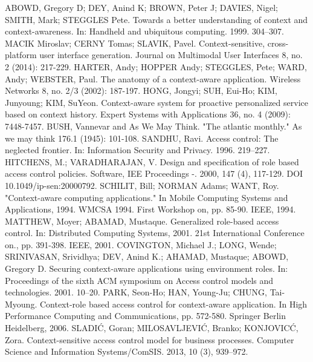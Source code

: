 \documentclass{poster15}
\begin{document}
\begin{thebibliography}{9}
ABOWD, Gregory D; DEY, Anind K; BROWN, Peter J; DAVIES, Nigel; SMITH, Mark; STEGGLES Pete. Towards a better understanding of context and context-awareness. In: Handheld and ubiquitous computing. 1999. 304–307.
MACIK Miroslav; CERNY Tomas; SLAVIK, Pavel. Context-sensitive, cross-platform user interface generation. Journal on Multimodal User Interfaces 8, no. 2 (2014): 217-229.
HARTER, Andy; HOPPER Andy; STEGGLES, Pete; WARD, Andy; WEBSTER, Paul. The anatomy of a context-aware application. Wireless Networks 8, no. 2/3 (2002): 187-197.
HONG, Jongyi; SUH, Eui-Ho; KIM, Junyoung; KIM, SuYeon. Context-aware system for proactive personalized service based on context history. Expert Systems with Applications 36, no. 4 (2009): 7448-7457.
BUSH, Vannevar and As We May Think. "The atlantic monthly." As we may think 176.1 (1945): 101-108.
SANDHU, Ravi. Access control: The neglected frontier. In: Information Security and Privacy. 1996. 219–227.
HITCHENS, M.; VARADHARAJAN, V. Design and specification of role based access control policies. Software, IEE Proceedings -. 2000, 147 (4), 117-129. DOI 10.1049/ip-sen:20000792.
SCHILIT, Bill; NORMAN Adams; WANT, Roy. "Context-aware computing applications." In Mobile Computing Systems and Applications, 1994. WMCSA 1994. First Workshop on, pp. 85-90. IEEE, 1994.
MATTHEW, Moyer; ABAMAD, Mustaque. Generalized role-based access control. In: Distributed Computing Systems, 2001. 21st International Conference on., pp. 391-398. IEEE, 2001.
COVINGTON, Michael J.; LONG, Wende; SRINIVASAN, Srividhya; DEV, Anind K.; AHAMAD, Mustaque; ABOWD, Gregory D. Securing context-aware applications using environment roles. In: Proceedings of the sixth ACM symposium on Access control models and technologies. 2001. 10–20.
PARK, Seon-Ho; HAN, Young-Ju; CHUNG, Tai-Myoung. Context-role based access control for context-aware application. In High Performance Computing and Communications, pp. 572-580. Springer Berlin Heidelberg, 2006.
SLADI\'C, Goran; MILOSAVLJEVI\'C, Branko; KONJOVIC\'C, Zora. Context-sensitive access control model for business processes. Computer Science and Information Systems/ComSIS. 2013, 10 (3), 939–972.

\end{thebibliography}
\end{document}
